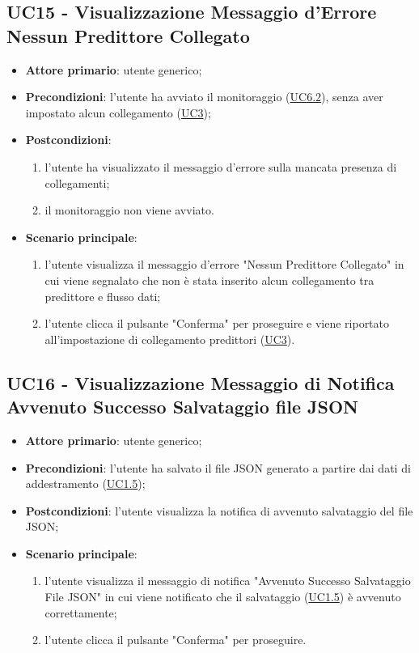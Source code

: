 	\subsection{UC15 - Visualizzazione Messaggio d'Errore Nessun Predittore Collegato}
		\begin{itemize}
			\item\textbf{Attore primario}: utente generico;
			\item\textbf{Precondizioni}: l’utente ha avviato il monitoraggio (\hyperref[par:UC6.2]{UC6.2}), senza aver impostato alcun collegamento (\hyperref[par:UC3]{UC3});
			\item\textbf{Postcondizioni}:
				\begin{enumerate}
					\item l’utente ha visualizzato il messaggio d'errore sulla mancata presenza di collegamenti;	
					\item	il monitoraggio non viene avviato.
				\end{enumerate}
			\item\textbf{Scenario principale}:
				\begin{enumerate}
					\item l’utente visualizza il messaggio d'errore "Nessun Predittore Collegato" in cui viene segnalato che non è stata inserito alcun collegamento tra predittore e flusso dati;
					\item l'utente clicca il pulsante "Conferma" per proseguire e viene riportato all'impostazione di collegamento predittori (\hyperref[par:UC3]{UC3}).		
				\end{enumerate}		
		\end{itemize}


	\label{par:UC16}
	\subsection{UC16 - Visualizzazione Messaggio di Notifica Avvenuto Successo Salvataggio file JSON}
		\begin{itemize}
			\item\textbf{Attore primario}: utente generico;
			\item\textbf{Precondizioni}: l'utente ha salvato il file JSON generato a partire dai dati di addestramento (\hyperref[par:UC1.5]{UC1.5});
			\item\textbf{Postcondizioni}: l'utente visualizza la notifica di avvenuto salvataggio del file JSON;					\item\textbf{Scenario principale}:
				\begin{enumerate}
					\item l’utente visualizza il messaggio di notifica "Avvenuto Successo Salvataggio File JSON" in cui viene notificato che il salvataggio (\hyperref[par:UC1.5]{UC1.5}) è avvenuto correttamente;
					\item l'utente clicca il pulsante "Conferma" per proseguire.		
				\end{enumerate}		
		\end{itemize}
	

